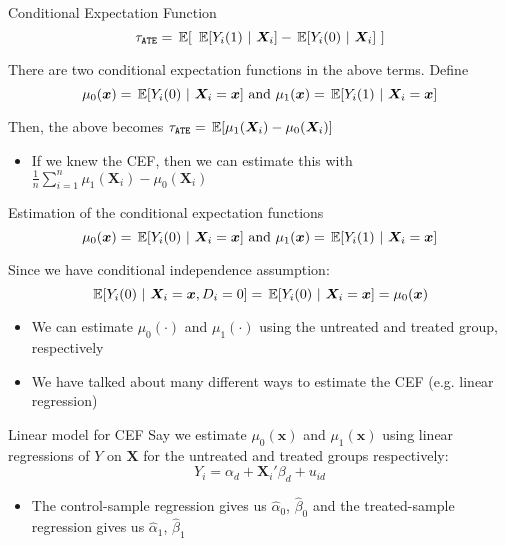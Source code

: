 \documentclass[aspectratio=169,t,11pt,table]{beamer}
\begin{document}
\begin{frame}{Conditional Expectation Function}
  $$
  \tau_{\texttt{ATE}} = \expec{\ \expec{Y_i(1)}{\bm{X}_i} - \expec{Y_i(0)}{\bm{X}_i} \ }
  $$

  \bigskip
  There are two conditional expectation functions in the above terms. Define
  $$
    \mu_0(\bm{x}) = \expec{Y_i(0)}{\bm{X}_i = \bm{x}} 
    \text{ and }
    \mu_1(\bm{x}) = \expec{Y_i(1)}{\bm{X}_i = \bm{x}}
  $$

  \pause
  \bigskip
  Then, the above becomes $\tau_{\texttt{ATE}} = \expec{ \mu_1(\bm{X}_i) - \mu_0(\bm{X}_i) }$
  \begin{itemize}
    \item If we knew the CEF, then we can estimate this with $\frac{1}{n} \sum_{i=1}^n \mu_1(\bm{X}_i) - \mu_0(\bm{X}_i)$
  \end{itemize}
\end{frame}

\begin{frame}{Estimation of the conditional expectation functions}
  \vspace*{-\bigskipamount}
  $$
    \mu_0(\bm{x}) = \expec{Y_i(0)}{\bm{X}_i = \bm{x}} 
    \text{ and }
    \mu_1(\bm{x}) = \expec{Y_i(1)}{\bm{X}_i = \bm{x}}
  $$

  \bigskip
  Since we have conditional independence assumption: 
  $$
    \expec{Y_i(0)}{\bm{X}_i = \bm{x}, D_i = 0} = \expec{Y_i(0)}{\bm{X}_i = \bm{x}} = \mu_0(\bm{x})
  $$ 
  \begin{itemize}
    \item We can estimate $\mu_0(\cdot)$ and $\mu_1(\cdot)$ using the untreated and treated group, respectively

    \item We have talked about many different ways to estimate the CEF (e.g. linear regression)
  \end{itemize}
\end{frame}

\begin{frame}{Linear model for CEF}
  Say we estimate $\mu_0(\bm{x})$ and $\mu_1(\bm{x})$ using linear regressions of $Y$ on $\bm{X}$ for the untreated and treated groups respectively:
  $$
    Y_i = \alpha_{d} + \bm{X}_{i}' \beta_d + u_{id}
  $$
  \begin{itemize}
    \item The control-sample regression gives us $\hat{\alpha}_{0}$, $\hat{\beta}_{0}$ and the treated-sample regression gives us $\hat{\alpha}_{1}$, $\hat{\beta}_{1}$
  \end{itemize}
\end{frame}
\end{document}

